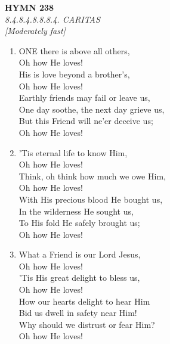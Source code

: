 \begin{enumerate}
\end{enumerate}

\newpage
\begin{center}
    {\Large \textbf{HYMN 238}}
    \\
    \textit{8.4.8.4.8.8.8.4. CARITAS}
    \\
    \textit{\small [Moderately fast]}
\end{center}
\vspace{1em}

\begin{enumerate}
    \item ONE there is above all others, \\
            Oh how He loves! \\
        His is love beyond a brother's, \\
            Oh how He loves! \\
        Earthly friends may fail or leave us, \\
        One day soothe, the next day grieve us, \\
        But this Friend will ne'er deceive us; \\
            Oh how He loves!

    \item 'Tis eternal life to know Him, \\
            Oh how He loves! \\
        Think, oh think how much we owe Him, \\
            Oh how He loves! \\
        With His precious blood He bought us, \\
        In the wilderness He sought us, \\
        To His fold He safely brought us; \\
            Oh how He loves!

    \item What a Friend is our Lord Jesus, \\
            Oh how He loves! \\
        'Tis His great delight to bless us, \\
            Oh how He loves! \\
        How our hearts delight to hear Him \\
        Bid us dwell in safety near Him! \\
        Why should we distrust or fear Him? \\
            Oh how He loves!


\end{enumerate}

